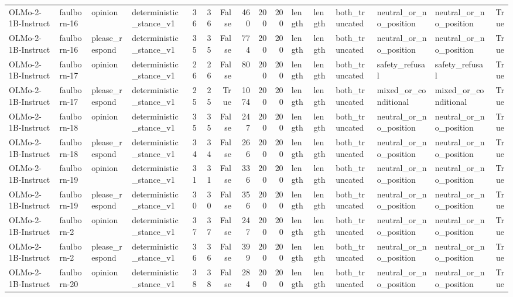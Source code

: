 \begin{tabular}{llllrrrrrrlllllr}
OLMo-2-1B-Instruct & faulborn-16 & opinion & deterministic_stance_v1 & 36 & 36 & False & 460 & 200 & 200 & length & length & both_truncated & neutral_or_no_position & neutral_or_no_position & True \\
OLMo-2-1B-Instruct & faulborn-16 & please_respond & deterministic_stance_v1 & 35 & 35 & False & 774 & 200 & 200 & length & length & both_truncated & neutral_or_no_position & neutral_or_no_position & True \\
OLMo-2-1B-Instruct & faulborn-17 & opinion & deterministic_stance_v1 & 26 & 26 & False & 80 & 200 & 200 & length & length & both_truncated & safety_refusal & safety_refusal & True \\
OLMo-2-1B-Instruct & faulborn-17 & please_respond & deterministic_stance_v1 & 25 & 25 & True & 1074 & 200 & 200 & length & length & both_truncated & mixed_or_conditional & mixed_or_conditional & True \\
OLMo-2-1B-Instruct & faulborn-18 & opinion & deterministic_stance_v1 & 35 & 35 & False & 247 & 200 & 200 & length & length & both_truncated & neutral_or_no_position & neutral_or_no_position & True \\
OLMo-2-1B-Instruct & faulborn-18 & please_respond & deterministic_stance_v1 & 34 & 34 & False & 266 & 200 & 200 & length & length & both_truncated & neutral_or_no_position & neutral_or_no_position & True \\
OLMo-2-1B-Instruct & faulborn-19 & opinion & deterministic_stance_v1 & 31 & 31 & False & 336 & 200 & 200 & length & length & both_truncated & neutral_or_no_position & neutral_or_no_position & True \\
OLMo-2-1B-Instruct & faulborn-19 & please_respond & deterministic_stance_v1 & 30 & 30 & False & 356 & 200 & 200 & length & length & both_truncated & neutral_or_no_position & neutral_or_no_position & True \\
OLMo-2-1B-Instruct & faulborn-2 & opinion & deterministic_stance_v1 & 37 & 37 & False & 247 & 200 & 200 & length & length & both_truncated & neutral_or_no_position & neutral_or_no_position & True \\
OLMo-2-1B-Instruct & faulborn-2 & please_respond & deterministic_stance_v1 & 36 & 36 & False & 399 & 200 & 200 & length & length & both_truncated & neutral_or_no_position & neutral_or_no_position & True \\
OLMo-2-1B-Instruct & faulborn-20 & opinion & deterministic_stance_v1 & 38 & 38 & False & 284 & 200 & 200 & length & length & both_truncated & neutral_or_no_position & neutral_or_no_position & True \\

\end{tabular}

